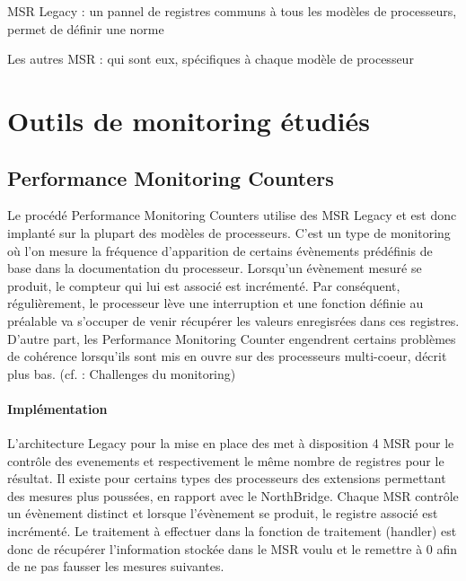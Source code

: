 		\benum
			\item{MSR Legacy : un pannel de registres communs à tous les modèles de processeurs, permet de définir une norme}
			\item{Les autres MSR : qui sont eux, spécifiques à chaque modèle de processeur}
		\eenum
	\section{Outils de monitoring étudiés}
	\subsection{Performance Monitoring Counters}
		Le procédé Performance Monitoring Counters utilise des MSR Legacy et est donc implanté sur la plupart des modèles de processeurs. C'est un type de monitoring où l'on mesure la fréquence d'apparition de certains évènements prédéfinis de base dans la documentation du processeur. Lorsqu'un évènement mesuré se produit, le compteur qui lui est associé est incrémenté. Par conséquent, régulièrement, le processeur lève une interruption et une fonction définie au préalable va s'occuper de venir récupérer les valeurs enregisrées dans ces registres. D'autre part, les Performance Monitoring Counter engendrent certains problèmes de cohérence lorsqu'ils sont mis en ouvre sur des processeurs multi-coeur, décrit plus bas. (cf. : Challenges du monitoring)
		\paragraph{Implémentation}
			L'architecture Legacy pour la mise en place des \PMC met à disposition 4 MSR pour le contrôle des evenements et respectivement le même nombre de registres pour le résultat. Il existe pour certains types des processeurs des extensions permettant des mesures plus poussées, en rapport avec le NorthBridge. Chaque MSR contrôle un évènement distinct et lorsque l'évènement se produit, le registre associé est incrémenté. Le traitement à effectuer dans la fonction de traitement (handler) est donc de récupérer l'information stockée dans le MSR voulu et le remettre à 0 afin de ne pas fausser les mesures suivantes.
